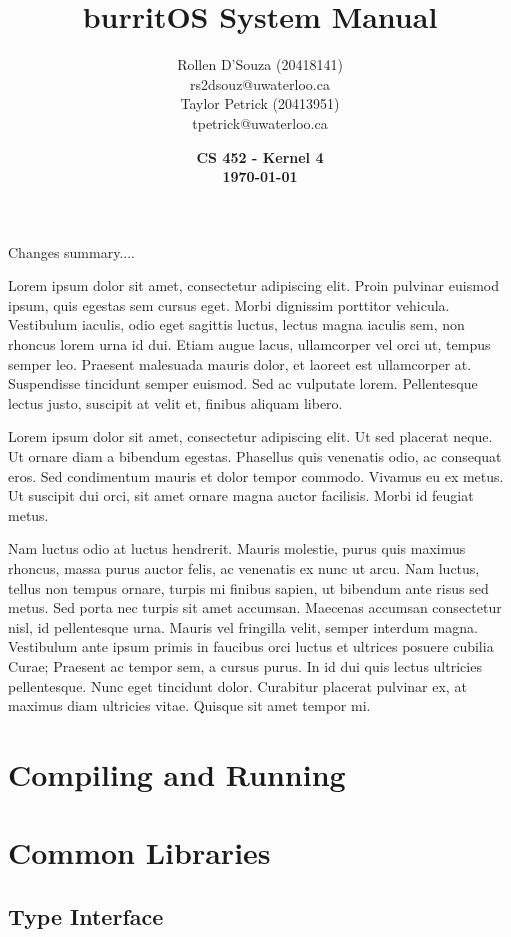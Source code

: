 \documentclass[twoside,a4paper]{refart}
\title{burritOS System Manual}
\author{Rollen D'Souza (20418141) \\
rs2dsouz@uwaterloo.ca \\
Taylor Petrick (20413951) \\
tpetrick@uwaterloo.ca \\}
\date{\textbf{CS 452 - Kernel 4 \\ \today}}
\begin{document}
\maketitle

Changes summary....

Lorem ipsum dolor sit amet, consectetur adipiscing elit. Proin pulvinar euismod ipsum, quis egestas sem cursus eget. Morbi dignissim porttitor vehicula. Vestibulum iaculis, odio eget sagittis luctus, lectus magna iaculis sem, non rhoncus lorem urna id dui. Etiam augue lacus, ullamcorper vel orci ut, tempus semper leo. Praesent malesuada mauris dolor, et laoreet est ullamcorper at. Suspendisse tincidunt semper euismod. Sed ac vulputate lorem. Pellentesque lectus justo, suscipit at velit et, finibus aliquam libero.

Lorem ipsum dolor sit amet, consectetur adipiscing elit. Ut sed placerat neque. Ut ornare diam a bibendum egestas. Phasellus quis venenatis odio, ac consequat eros. Sed condimentum mauris et dolor tempor commodo. Vivamus eu ex metus. Ut suscipit dui orci, sit amet ornare magna auctor facilisis. Morbi id feugiat metus.

Nam luctus odio at luctus hendrerit. Mauris molestie, purus quis maximus rhoncus, massa purus auctor felis, ac venenatis ex nunc ut arcu. Nam luctus, tellus non tempus ornare, turpis mi finibus sapien, ut bibendum ante risus sed metus. Sed porta nec turpis sit amet accumsan. Maecenas accumsan consectetur nisl, id pellentesque urna. Mauris vel fringilla velit, semper interdum magna. Vestibulum ante ipsum primis in faucibus orci luctus et ultrices posuere cubilia Curae; Praesent ac tempor sem, a cursus purus. In id dui quis lectus ultricies pellentesque. Nunc eget tincidunt dolor. Curabitur placerat pulvinar ex, at maximus diam ultricies vitae. Quisque sit amet tempor mi.

\newpage
\tableofcontents
\newpage


\section{Compiling and Running}

\section{Common Libraries}
\subsection{Type Interface}
\end{document}
